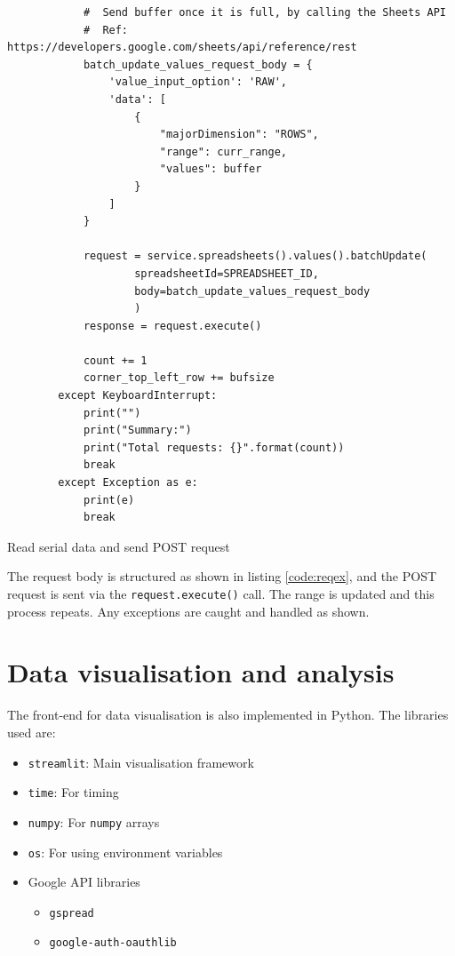 \documentclass[a4paper,12pt]{report}
\newenvironment{code}{\captionsetup{type=listing}}{}
\begin{document}
\begin{code}
    \begin{verbatim}
            #  Send buffer once it is full, by calling the Sheets API
            #  Ref: https://developers.google.com/sheets/api/reference/rest
            batch_update_values_request_body = {
                'value_input_option': 'RAW',
                'data': [
                    {
                        "majorDimension": "ROWS",
                        "range": curr_range,
                        "values": buffer
                    }
                ]
            }

            request = service.spreadsheets().values().batchUpdate(
                    spreadsheetId=SPREADSHEET_ID,
                    body=batch_update_values_request_body
                    )
            response = request.execute()

            count += 1
            corner_top_left_row += bufsize
        except KeyboardInterrupt:
            print("")
            print("Summary:")
            print("Total requests: {}".format(count))
            break
        except Exception as e:
            print(e)
            break
    \end{verbatim}
    \caption{Read serial data and send POST request}
    \label{code:initser}
\end{code}
\vspace{0.5cm}

The request body is structured as shown in listing \ref{code:reqex}, and the
POST request is sent via the \texttt{request.execute()} call. The
range is updated and this process repeats. Any exceptions are caught and
handled as shown.

\section{Data visualisation and analysis}
The front-end for data visualisation is also implemented in Python. The
libraries used are:
\begin{itemize}
    \item \texttt{streamlit}: Main visualisation framework
    \item \texttt{time}: For timing
    \item \texttt{numpy}: For \texttt{numpy} arrays
    \item \texttt{os}: For using environment variables
    \item Google API libraries
        \begin{itemize}
            \item \texttt{gspread}
            \item \texttt{google-auth-oauthlib}
        \end{itemize}
\end{itemize}
\end{document}
